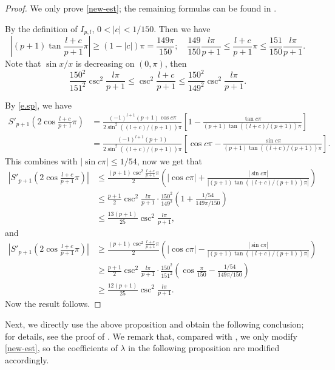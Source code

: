 \documentclass[reqno,11pt,graphicx,]{amsart}
\numberwithin{equation}{section}
\theoremstyle{plain}
\newcommand{\3}{\mathbf{3}}
\begin{document}
	\begin{proof}
		We only prove \eqref{new-est}; the remaining formulas can be found in \cite[Proposition 3.2]{FLW2011}.
		
		By the definition of $I_{p,l}$, $0< |c|<1/150$. Then we have 
		\begin{equation*}
			\left|(p+1)\tan\frac{l+c}{p+1}\pi\right|\geq(1-|c|)\pi=\frac{149\pi}{150};\quad \frac{149}{150}\frac{l\pi}{p+1}\leq\frac{l+c}{p+1}\pi\leq\frac{151}{150}\frac{l\pi}{p+1}.
		\end{equation*}
		Note that $\sin x/x$ is decreasing on $(0,\pi)$, then 
		\begin{equation*}
			\frac{150^2}{151^2}\csc^2\frac{l\pi}{p+1}\leq\csc^2\frac{l+c}{p+1}\leq\frac{150^2}{149^2}\csc^2\frac{l\pi}{p+1}.
		\end{equation*}
		
By \eqref{e.sp}, we have
		\begin{align*}
			S'_{p+1}\left(2\cos\frac{l+c}{p+1}\pi\right)&=\frac{(-1)^{l+1}(p+1)\cos c\pi}{2\sin^2((l+c)/(p+1))\pi}\left[1-\frac{\tan c\pi}{(p+1)\tan((l+c)/(p+1))\pi}\right]\\
			&=\frac{(-1)^{l+1}(p+1)}{2\sin^2((l+c)/(p+1))\pi}\left[\cos c\pi-\frac{\sin c\pi}{(p+1)\tan((l+c)/(p+1))\pi}\right].
		\end{align*}
		This combines with $|\sin c\pi|\leq1/54$, now we get that
		\begin{align*}
			\left|S'_{p+1}(2\cos\frac{l+c}{p+1}\pi)\right|&\leq\frac{(p+1)\csc^2\frac{l+c}{p+1}\pi}{2}\left(|\cos c\pi|+\frac{|\sin c\pi|}{|(p+1)\tan((l+c)/(p+1))\pi|}\right)\\
			&\leq\frac{p+1}{2}\csc^2\frac{l\pi}{p+1}\cdot\frac{150^2}{149^2}\left(1+\frac{1/54}{149\pi/150}\right)\\
			&\leq\frac{13(p+1)}{25}\csc^2\frac{l\pi}{p+1},
		\end{align*}
		and
		\begin{align*}
			\left|S'_{p+1}(2\cos\frac{l+c}{p+1}\pi)\right|&\geq\frac{(p+1)\csc^2\frac{l+c}{p+1}\pi}{2}\left(|\cos c\pi|-\frac{|\sin c\pi|}{|(p+1)\tan((l+c)/(p+1))\pi|}\right)\\
			&\geq\frac{p+1}{2}\csc^2\frac{l\pi}{p+1}\cdot\frac{150^2}{151^2}\left(\cos\frac{\pi}{150}-\frac{1/54}{149\pi/150}\right)\\
			&\geq\frac{12(p+1)}{25}\csc^2\frac{l\pi}{p+1}.
		\end{align*}
		Now the result follows.
	\end{proof}
	Next, we directly use the above proposition and obtain the following conclusion; for details, see the proof of \cite[Proposition 3.3]{FLW2011}. We remark that, compared with \cite[Proposition 3.3]{FLW2011}, we only modify \eqref{new-est}, so the coefficients of $\lambda$ in the following proposition are modified accordingly.
	
\end{document}
